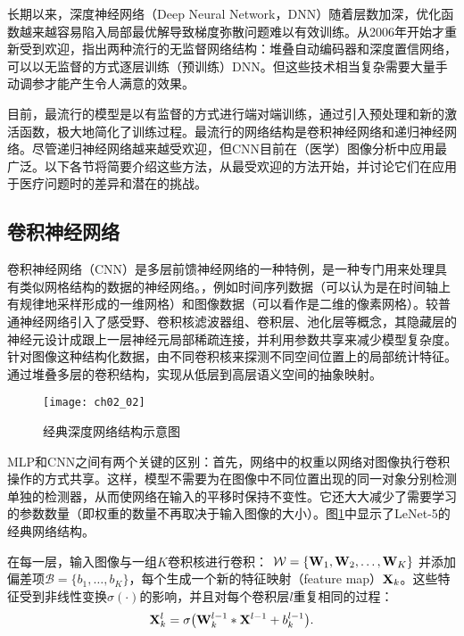 长期以来，深度神经网络（Deep Neural Network，DNN）随着层数加深，优化函数越来越容易陷入局部最优解导致梯度弥散问题难以有效训练。从2006年开始才重新受到欢迎\citep{Hinton2006a}，指出两种流行的无监督网络结构：堆叠自动编码器和深度置信网络，可以以无监督的方式逐层训练（预训练）DNN。但这些技术相当复杂需要大量手动调参才能产生令人满意的效果。

目前，最流行的模型是以有监督的方式进行端对端训练，通过引入预处理和新的激活函数，极大地简化了训练过程。最流行的网络结构是卷积神经网络和递归神经网络。尽管递归神经网络越来越受欢迎，但CNN目前在（医学）图像分析中应用最广泛。以下各节将简要介绍这些方法，从最受欢迎的方法开始，并讨论它们在应用于医疗问题时的差异和潜在的挑战。

\subsection{卷积神经网络}

卷积神经网络（CNN）是多层前馈神经网络的一种特例，是一种专门用来处理具有类似网格结构的数据的神经网络。，例如时间序列数据（可以认为是在时间轴上有规律地采样形成的一维网格）和图像数据（可以看作是二维的像素网格）。较普通神经网络引入了感受野、卷积核滤波器组、卷积层、池化层等概念，其隐藏层的神经元设计成跟上一层神经元局部稀疏连接，并利用参数共享来减少模型复杂度。针对图像这种结构化数据，由不同卷积核来探测不同空间位置上的局部统计特征。通过堆叠多层的卷积结构，实现从低层到高层语义空间的抽象映射。
\begin{figure}[!htbp]
    \centering
    \texttt{[image: ch02\_02]}
    \caption{经典深度网络结构示意图}
    \label{fig:ch02_02}
\end{figure}
MLP和CNN之间有两个关键的区别：首先，网络中的权重以网络对图像执行卷积操作的方式共享。这样，模型不需要为在图像中不同位置出现的同一对象分别检测单独的检测器，从而使网络在输入的平移时保持不变性。它还大大减少了需要学习的参数数量（即权重的数量不再取决于输入图像的大小）。图\ref{fig:ch02_02}中显示了LeNet-5\citep{Jarrett2009}的经典网络结构。

在每一层，输入图像与一组$K$卷积核进行卷积： $\mathcal{W} = \{ {\bf W}_{1}, {\bf W}_{2}, \ldots, {\bf W}_{K} \}$ 并添加偏差项$\mathcal{B} = \{b_{1}, \ldots, b_{K}\}$，每个生成一个新的特征映射（feature map）${\bf X}_{k}$。这些特征受到非线性变换$\sigma(\cdot)$的影响，并且对每个卷积层$l$重复相同的过程：
\begin{equation}
\label{eq::mapping_cnn}
 {\bf X}_{k}^{l} = \sigma\big( {\bf W}_{k}^{l -1} \ast {\bf X}^{l -1} + b_{k}^{l-1} \big).
\end{equation}

